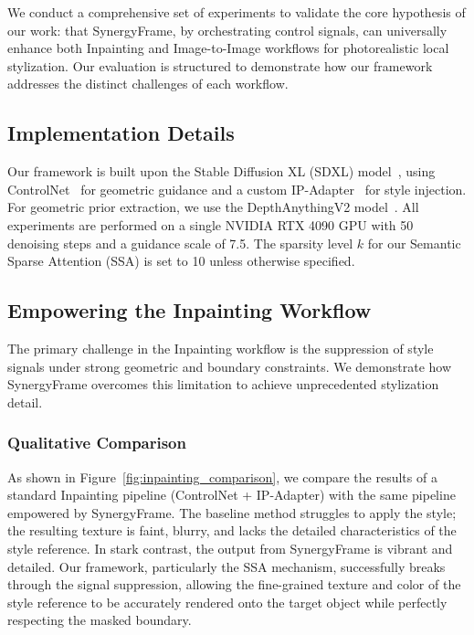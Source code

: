 \documentclass[letterpaper]{article} %
\begin{document}
We conduct a comprehensive set of experiments to validate the core hypothesis of our work: that SynergyFrame, by orchestrating control signals, can universally enhance both Inpainting and Image-to-Image workflows for photorealistic local stylization. Our evaluation is structured to demonstrate how our framework addresses the distinct challenges of each workflow.

\subsection{Implementation Details}
Our framework is built upon the Stable Diffusion XL (SDXL) model~\cite{sdxl}, using ControlNet~\cite{controlnet} for geometric guidance and a custom IP-Adapter~\cite{ipadapter} for style injection. For geometric prior extraction, we use the DepthAnythingV2 model~\cite{depthanythingv2}. All experiments are performed on a single NVIDIA RTX 4090 GPU with 50 denoising steps and a guidance scale of 7.5. The sparsity level $k$ for our Semantic Sparse Attention (SSA) is set to 10 unless otherwise specified.

\subsection{Empowering the Inpainting Workflow}
\label{sec:exp_inpainting}

The primary challenge in the Inpainting workflow is the suppression of style signals under strong geometric and boundary constraints. We demonstrate how SynergyFrame overcomes this limitation to achieve unprecedented stylization detail.

\subsubsection{Qualitative Comparison}
As shown in Figure~\ref{fig:inpainting_comparison}, we compare the results of a standard Inpainting pipeline (ControlNet + IP-Adapter) with the same pipeline empowered by SynergyFrame. The baseline method struggles to apply the style; the resulting texture is faint, blurry, and lacks the detailed characteristics of the style reference. In stark contrast, the output from SynergyFrame is vibrant and detailed. Our framework, particularly the SSA mechanism, successfully breaks through the signal suppression, allowing the fine-grained texture and color of the style reference to be accurately rendered onto the target object while perfectly respecting the masked boundary.
\end{document}
